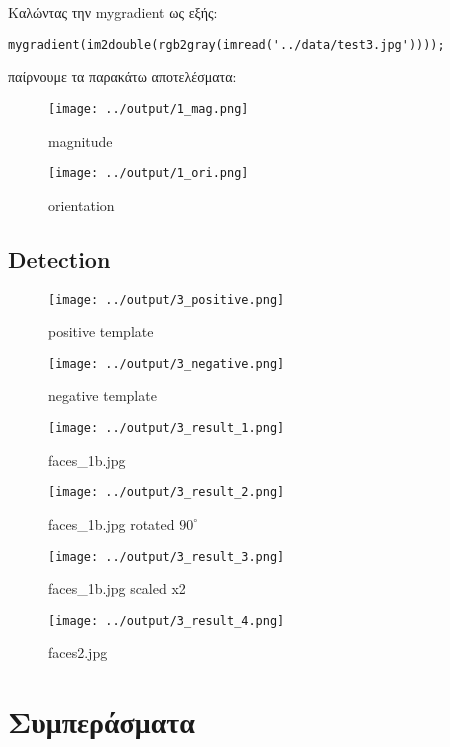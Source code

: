 \documentclass[11pt]{scrartcl} %
\begin{document}
Καλώντας την mygradient ως εξής:

\begin{verbatim}
mygradient(im2double(rgb2gray(imread('../data/test3.jpg'))));
\end{verbatim}

παίρνουμε τα παρακάτω αποτελέσματα:

\begin{figure}[H]
  \texttt{[image: ../output/1\_mag.png]}
  \caption{magnitude}
\end{figure}

\begin{figure}[H]
  \texttt{[image: ../output/1\_ori.png]}
  \caption{orientation}
\end{figure}

\subsection{Detection}

\begin{figure}[H]
  \texttt{[image: ../output/3\_positive.png]}
  \caption{positive template}
\end{figure}

\begin{figure}[H]
  \texttt{[image: ../output/3\_negative.png]}
  \caption{negative template}
\end{figure}

\begin{figure}[H]
  \texttt{[image: ../output/3\_result\_1.png]}
  \caption{faces\_1b.jpg}
\end{figure}

\begin{figure}[H]
  \texttt{[image: ../output/3\_result\_2.png]}
  \caption{faces\_1b.jpg rotated $90^{\circ}$}
\end{figure}

\begin{figure}[H]
  \texttt{[image: ../output/3\_result\_3.png]}
  \caption{faces\_1b.jpg scaled x2}
\end{figure}

\begin{figure}[H]
  \texttt{[image: ../output/3\_result\_4.png]}
  \caption{faces2.jpg}
\end{figure}

\section{Συμπεράσματα}
\end{document}
